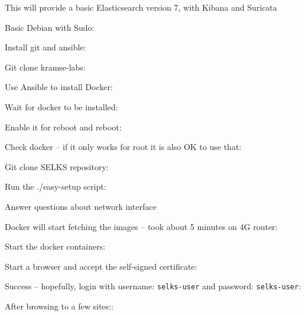 \documentclass[a4paper,11pt,notitlepage,landscape]{report}
\begin{document}
This will provide a basic Elasticsearch version 7, with Kibana and Suricata

\eject

Basic Debian with Sudo:

Install git and ansible:
\eject

Git clone kramse-labs:

Use Ansible to install Docker:
\eject

Wait for docker to be installed:

Enable it for reboot and reboot:
\eject

Check docker -- if it only works for root it is also OK to use that:

Git clone SELKS repository:
\eject

Run the ./easy-setup script:

Answer questions about network interface
\eject

Docker will start fetching the images -- took about 5 minutes on 4G router:

\eject

Start the docker containers:



Start a browser and accept the self-signed certificate:

\eject

Success -- hopefully, login with username: \verb+selks-user+ and password: \verb+selks-user+:

After browsing to a few sites::
\end{document}
